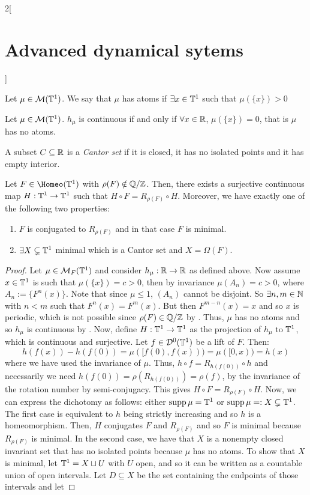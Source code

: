 \documentclass[../../../main_math.tex]{subfiles}
\begin{document}
\begin{multicols}{2}[\section{Advanced dynamical sytems}]
  \begin{lemma}
    Let $\mu\in\mathcal{M}(\mathbb{T}^1)$. We say that $\mu$ has atoms if $\exists x\in\mathbb{T}^1$ such that $\mu(\{x\})>0$
  \end{lemma}
  \begin{lemma}\label{ADS:lemma_atom}
    Let $\mu\in\mathcal{M}(\mathbb{T}^1)$. $h_\mu$ is continuous if and only if $\forall x\in\mathbb{R}$, $\mu(\{x\})=0$, that is $\mu$ has no atoms.
  \end{lemma}
  \begin{definition}
    A subset $C\subseteq \mathbb{R}$ is a \emph{Cantor set} if it is closed, it has no isolated points and it has empty interior.
  \end{definition}
  \begin{theorem}\label{ADS:theorem_irrational_rotation_number}
    Let $F\in\Homeo(\TT^1)$ with $\rho(F)\notin\quot{\QQ}{\ZZ}$. Then, there exists a surjective continuous map $H:\mathbb{T}^1\to \mathbb{T}^1$ such that $H\circ F=R_{\rho(F)}\circ H$. Moreover, we have exactly one of the following two properties:
    \begin{enumerate}
      \item $F$ is conjugated to $R_{\rho(F)}$ and in that case $F$ is minimal.
      \item $\exists X\subsetneq \mathbb{T}^1$ minimal which is a Cantor set and $X=\Omega(F)$.
    \end{enumerate}
  \end{theorem}
  \begin{proof}
    Let $\mu\in\mathcal{M}_F(\mathbb{T}^1)$ and consider $h_\mu:\mathbb{R}\to\mathbb{R}$ as defined above. Now assume $x\in \mathbb{T}^1$ is such that $\mu(\{x\})=c>0$, then by invariance $\mu(A_n)=c>0$, where $A_n:=\{F^n(x)\}$. Note that since $\mu\leq 1$, $(A_n)$ cannot be disjoint. So $\exists n,m\in\mathbb{N}$ with $n<m$ such that $F^n(x)=F^m(x)$. But then $F^{m-n}(x)=x$ and so $x$ is periodic, which is not possible since $\rho(F)\in\quot{\QQ}{\ZZ}$ by . Thus, $\mu$ has no atoms and so $h_\mu$ is continuous by . Now, define $H:\mathbb{T}^1\to \mathbb{T}^1$ as the projection of $h_\mu$ to $\mathbb{T}^1$, which is continuous and surjective. Let $f\in\mathcal{D}^0(\mathbb{T}^1)$ be a lift of $F$. Then:
    $$
      h(f(x))-h(f(0))=\mu([f(0),f(x)))=\mu([0,x))=h(x)
    $$
    where we have used the invariance of $\mu$. Thus, $h\circ f=R_{h(f(0))}\circ h$ and necessarily we need $h(f(0))=\rho(R_{h(f(0))})=\rho(f)$, by the invariance of the rotation number by semi-conjugacy. This gives $H\circ F=R_{\rho(F)}\circ H$. Now, we can express the dichotomy as follows: either $\operatorname{supp}\mu=\mathbb{T}^1$ or $\operatorname{supp}\mu=:X\subsetneq \mathbb{T}^1$. The first case is equivalent to $h$ being strictly increasing and so $h$ is a homeomorphism. Then, $H$ conjugates $F$ and $R_{\rho(F)}$ and so $F$ is minimal because $R_{\rho(F)}$ is minimal. In the second case, we have that $X$ is a nonempty closed invariant set that has no isolated points because $\mu$ has no atoms. To show that $X$ is minimal, let $\mathbb{T}^1=X\sqcup U$ with $U$ open, and so it can be written as a countable union of open intervals. Let $D\subseteq X$ be the set containing the endpoints of those intervals and let

\end{proof}
\end{multicols}
\end{document}

